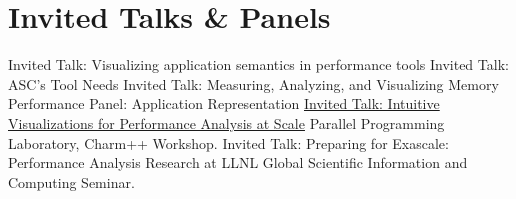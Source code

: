 \section{Invited Talks \& Panels}
		{\newline Invited Talk: Visualizing application semantics in performance tools}
		{}{}{}
		{\newline Invited Talk: ASC's Tool Needs}
		{}{}{}
		{\newline Invited Talk: Measuring, Analyzing, and Visualizing Memory Performance}
		{}{}{}
		{\newline Panel: Application Representation}
		{}{}{}
		{\href{https://www.youtube.com/watch?v=8rJ4231hq9g}
		 {Invited Talk: Intuitive Visualizations for Performance Analysis at Scale}}
		{}{}{Parallel Programming Laboratory, Charm++ Workshop.}
		{Invited Talk: Preparing for Exascale: Performance Analysis Research at LLNL}
		{}{}
		{Global Scientific Information and Computing Seminar.}
